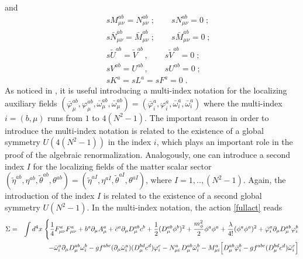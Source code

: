 \begin{appendix}
\begin{eqnarray}
\end{eqnarray}
and 
\begin{eqnarray}
&&
sM^{ab}_{\mu\nu} = N^{ab}_{\mu\nu}\;; \qquad sN^{ab}_{\mu\nu} = 0\;; \nonumber \\
&&
s\bar{N}^{ab}_{\mu\nu} = \bar{M}^{ab}_{\mu\nu}\;; \qquad s\bar{M}^{ab}_{\mu\nu} = 0\;; \nonumber \\
&&
s\tilde{U}^{ab}=\tilde{V}^{ab}\,,\qquad s\tilde{V}^{ab}=0\;; \nonumber \\
&&
sV^{ab}=U^{ab}\,,\qquad sU^{ab}=0\;; \nonumber \\
&&
sK^{a}=sL^{a}=sF^{a}=0\;.
\end{eqnarray}
As noticed in \cite{Zwanziger:1988jt,Zwanziger:1989mf,Zwanziger:1992qr,Dudal:2007cw,Dudal:2008sp,Dudal:2011gd}, it is useful introducing a multi-index notation for the localizing auxiliary fields $({\bar \varphi}^{ab}_\mu, { \varphi}^{ab}_\mu, {\bar \omega}^{ab}_\mu, {\bar \omega}^{ab}_\mu) = ({\bar \varphi}^{a}_i, { \varphi}^{a}_i, {\bar \omega}^{a}_i, {\bar \omega}^{a}_i) $ where the multi-index $i=(b,\mu)$ runs from $1$ to $4(N^2-1)$. The important reason in order to introduce the multi-index notation is related to the existence of a global symmetry $U(4(N^2-1))$ in the index $i$, which plays an important role in the proof of the algebraic renormalization. Analogously, one can introduce a second index $I$ for the localizing fields of the matter scalar sector $(\tilde{\eta}^{ab},{\eta}^{ab},\tilde{\theta}^{ab},{\theta}^{ab})= (\tilde{\eta}^{aI},{\eta}^{aI},\tilde{\theta}^{aI},{\theta}^{aI})$, where $I=1,..,(N^2-1)$. Again, the introduction of the index $I$ is related to the existence of a second global symmetry $U(N^2-1)$. In the multi-index notation, the action \eqref{fullact} reads 
\begin{eqnarray}
\label{fullactm}
\Sigma &=& \int d^4x\; \Biggl\{
\frac{1}{4}F^a_{\mu\nu} F^a_{\mu\nu}
+ b^{a}\partial_{\mu}A^{a}_{\mu}
+ \bar{c}^{a}\partial_{\mu}D^{ab}_{\mu}c^{b}
+ \frac{1}{2}(D^{ab}_{\mu}\phi^{b})^{2} + \frac{m^2_{\phi}}{2} \phi^a \phi^a 
+ \frac{\lambda}{4!}(\phi^{a}\phi^{a})^{2}
+ \bar{\varphi}^{a}_{i}\partial_{\mu}D^{ab}_{\mu}\varphi^{b}_{i}
\nonumber \\
&&
- \bar{\omega}^{a}_{i}\partial_{\mu}D^{ab}_{\mu}\omega^{b}_{i}
- gf^{abc}(\partial_{\mu}\bar{\omega}^{a}_{i})(D^{bd}_{\mu}c^{d})\varphi^{c}_{i}
-{N}^{a}_{\mu{i}}\,D^{ab}_{\mu}\bar{\omega}^{b}_{i}
-{M}^{a}_{\mu{i}}\Bigl[D^{ab}_{\mu}\bar{\varphi}^{b}_{i}
-gf^{abc}(D^{bd}_{\mu}c^{d})\bar{\omega}^{c}_{i}
\Bigr]
\nonumber \\

\end{eqnarray}
\end{appendix}
